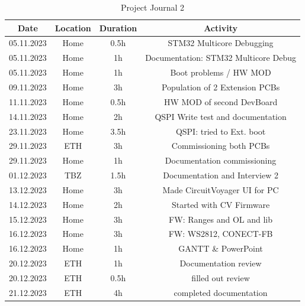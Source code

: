\begin{table}[H]
  \centering
  
  \begin{tabular}{||c | c | c || c||} 
    \hline
    Date &  Location & Duration & Activity \\ [0.5ex] 
    \hline\hline
    05.11.2023 & Home & 0.5h & STM32 Multicore Debugging \\ 
    \hline
     05.11.2023 & Home & 1h & Documentation: STM32 Multicore Debug \\ 
    \hline
     05.11.2023 & Home & 1h & Boot problems / HW MOD \\ 
    \hline
    09.11.2023 & Home & 3h & Population of 2 Extension PCBs \\ 
    \hline
    11.11.2023 & Home & 0.5h & HW MOD of second DevBoard \\ 
    \hline
    14.11.2023 & Home & 2h & QSPI Write test and documentation \\ 
    \hline
    23.11.2023 & Home & 3.5h & QSPI: tried to Ext. boot \\ 
    \hline
    29.11.2023 & ETH & 3h & Commissioning both PCBs \\ 
    \hline
    29.11.2023 & Home & 1h & Documentation commissioning \\ 
    \hline
    01.12.2023 & TBZ & 1.5h & Documentation and Interview 2 \\ 
    \hline
    13.12.2023 & Home & 3h & Made CircuitVoyager UI for PC \\ 
    \hline
    14.12.2023 & Home & 2h & Started with CV Firmware \\ 
    \hline
    15.12.2023 & Home & 3h & FW: Ranges and OL and lib \\ 
    \hline
    16.12.2023 & Home & 3h & FW: WS2812, CONECT-FB \\ 
    \hline
    16.12.2023 & Home & 1h & GANTT \& PowerPoint \\ 
    \hline
    20.12.2023 & ETH & 1h & Documentation review \\ 
    \hline
    20.12.2023 & ETH & 0.5h & filled out review \\ 
    \hline
    21.12.2023 & ETH & 4h & completed documentation \\ 
    \hline
  \end{tabular}
  \caption{Project Journal 2}\label{tab:Project Journal 2}
\end{table}

\newpage



